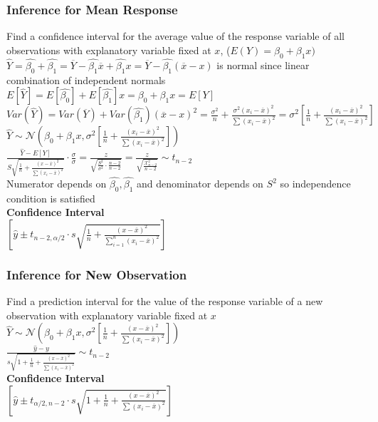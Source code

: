 \documentclass{article}
\begin{document}
\subsubsection{Inference for Mean Response}
Find a confidence interval for the average value of the response variable of all observations with explanatory variable fixed at $x$, ($E(Y)=\beta_0+\beta_1x)$\\
$\hat{Y}=\hat{\beta_0}+\hat{\beta_1}=\overline{Y}-\hat{\beta_1}\overline{x}+\hat{\beta_1}x=\overline{Y}-\hat{\beta_1}(\overline{x}-x)$ is normal since linear combination of independent normals\\
$E[\hat{Y}]=E[\hat{\beta_0}]+E[\hat{\beta_1}]x=\beta_0+\beta_1x=E[Y]$\\
$Var(\hat{Y})=Var(\overline{Y})+Var(\hat{\beta_1})(\overline{x}-x)^2=\frac{\sigma^2}{n}+\frac{\sigma^2(x_i-\overline{x})^2}{\sum(x_i-\overline{x})^2}=\sigma^2[\frac{1}{n}+\frac{(x_i-\overline{x})^2}{\sum(x_i-\overline{x})^2}]$\\
$\hat{Y}\sim\mathcal{N}(\beta_0+\beta_1x,\sigma^2[\frac{1}{n}+\frac{(x_i-\overline{x})^2}{\sum(x_i-\overline{x})^2}])$\\
$\frac{\hat{Y}-E[Y]}{S\sqrt{\frac{1}{n}+\frac{(x-\overline{x})^2}{\sum(x_i-\overline{x})^2}}}\cdot\frac{\sigma}{\sigma}=\frac{z}{\sqrt{\frac{S^2}{\sigma^2}\cdot\frac{n-2}{n-2}}}=\frac{z}{\sqrt{\frac{\mathcal{X}^2_{n-2}}{n-2}}}\sim t_{n-2}$\\
Numerator depends on $\hat{\beta_0},\hat{\beta_1}$ and denominator depends on $S^2$ so independence condition is satisfied\\
\textbf{Confidence Interval}\\
$[\hat{y}\pm t_{n-2,\alpha/2}\cdot s\sqrt{\frac{1}{n}+\frac{(x-\overline{x})^2}{\sum_{i=1}^n(x_i-\overline{x})^2}}]$
\subsubsection{Inference for New Observation}
Find a prediction interval for the value of the response variable of a new observation with explanatory variable fixed at $x$\\
$\hat{Y}\sim\mathcal{N}(\beta_0+\beta_1x,\sigma^2[\frac{1}{n}+\frac{(x-\overline{x})^2}{\sum(x_i-\overline{x})^2}])$\\
$\frac{\hat{y}-y}{s\sqrt{1+\frac{1}{n}+\frac{(x-\overline{x})^2}{\sum(x_i-\overline{x})^2}}}\sim t_{n-2}$\\
\textbf{Confidence Interval}\\
$[\hat y\pm t_{\alpha/2,n-2}\cdot s\sqrt{1+\frac{1}{n}+\frac{(x-\overline{x})^2}{\sum(x_i-\overline{x})^2}}]$
\end{document}
